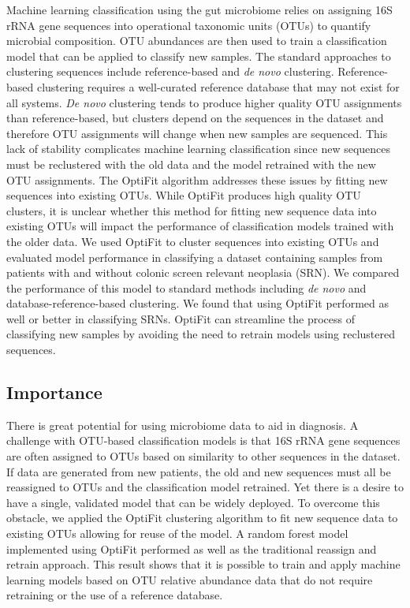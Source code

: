 \documentclass[
]{article}
\begin{document}
Machine learning classification using the gut microbiome relies on
assigning 16S rRNA gene sequences into operational taxonomic units
(OTUs) to quantify microbial composition. OTU abundances are then used
to train a classification model that can be applied to classify new
samples. The standard approaches to clustering sequences include
reference-based and \emph{de novo} clustering. Reference-based
clustering requires a well-curated reference database that may not exist
for all systems. \emph{De novo} clustering tends to produce higher
quality OTU assignments than reference-based, but clusters depend on the
sequences in the dataset and therefore OTU assignments will change when
new samples are sequenced. This lack of stability complicates machine
learning classification since new sequences must be reclustered with the
old data and the model retrained with the new OTU assignments. The
OptiFit algorithm addresses these issues by fitting new sequences into
existing OTUs. While OptiFit produces high quality OTU clusters, it is
unclear whether this method for fitting new sequence data into existing
OTUs will impact the performance of classification models trained with
the older data. We used OptiFit to cluster sequences into existing OTUs
and evaluated model performance in classifying a dataset containing
samples from patients with and without colonic screen relevant neoplasia
(SRN). We compared the performance of this model to standard methods
including \emph{de novo} and database-reference-based clustering. We
found that using OptiFit performed as well or better in classifying
SRNs. OptiFit can streamline the process of classifying new samples by
avoiding the need to retrain models using reclustered sequences.

\hypertarget{importance}{%
\subsection{Importance}\label{importance}}

There is great potential for using microbiome data to aid in diagnosis.
A challenge with OTU-based classification models is that 16S rRNA gene
sequences are often assigned to OTUs based on similarity to other
sequences in the dataset. If data are generated from new patients, the
old and new sequences must all be reassigned to OTUs and the
classification model retrained. Yet there is a desire to have a single,
validated model that can be widely deployed. To overcome this obstacle,
we applied the OptiFit clustering algorithm to fit new sequence data to
existing OTUs allowing for reuse of the model. A random forest model
implemented using OptiFit performed as well as the traditional reassign
and retrain approach. This result shows that it is possible to train and
apply machine learning models based on OTU relative abundance data that
do not require retraining or the use of a reference database.
\end{document}
